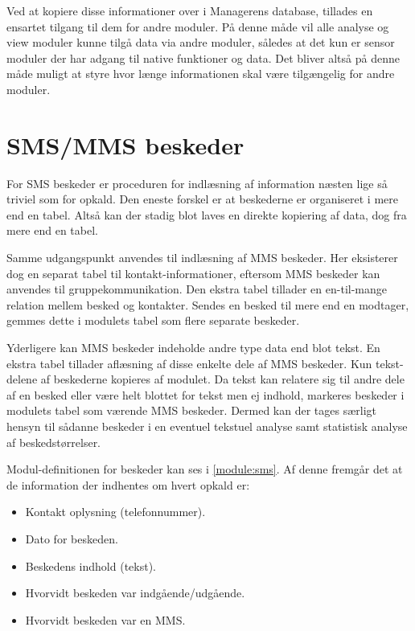 Ved at kopiere disse informationer over i Managerens database, tillades en ensartet tilgang til dem for andre moduler.
På denne måde vil alle analyse og view moduler kunne tilgå data via andre moduler, således at det kun er sensor moduler der har adgang til native funktioner og data.
Det bliver altså på denne måde muligt at styre hvor længe informationen skal være tilgængelig for andre moduler.



\section{SMS/MMS beskeder}\label{implementerede_moduler:smsmms}
For SMS beskeder er proceduren for indlæsning af information næsten lige så triviel som for opkald.
Den eneste forskel er at beskederne er organiseret i mere end en tabel.
Altså kan der stadig blot laves en direkte kopiering af data, dog fra mere end en tabel.

Samme udgangspunkt anvendes til indlæsning af MMS beskeder.
Her eksisterer dog en separat tabel til kontakt-informationer, eftersom MMS beskeder kan anvendes til gruppekommunikation.
Den ekstra tabel tillader en en-til-mange relation mellem besked og kontakter.
Sendes en besked til mere end en modtager, gemmes dette i modulets tabel som flere separate beskeder.

Yderligere kan MMS beskeder indeholde andre type data end blot tekst.
En ekstra tabel tillader aflæsning af disse enkelte dele af MMS beskeder.
Kun tekst-delene af beskederne kopieres af modulet.
Da tekst kan relatere sig til andre dele af en besked eller være helt blottet for tekst men ej indhold, markeres beskeder i modulets tabel som værende MMS beskeder.
Dermed kan der tages særligt hensyn til sådanne beskeder i en eventuel tekstuel analyse samt statistisk analyse af beskedstørrelser.

Modul-definitionen for beskeder kan ses i \cref{module:sms}.
Af denne fremgår det at de information der indhentes om hvert opkald er:
\begin{itemize}
\item Kontakt oplysning (telefonnummer).
\item Dato for beskeden.
\item Beskedens indhold (tekst).
\item Hvorvidt beskeden var indgående/udgående.
\item Hvorvidt beskeden var en MMS.
\end{itemize}


